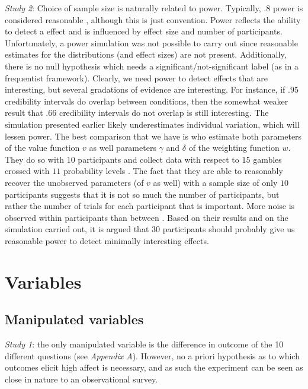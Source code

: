 \documentclass[12pt]{article}
\begin{document}
\emph{Study 2}: Choice of sample
size is naturally related to
power. Typically, $.8$ power is considered reasonable
\autocite{cohen1992power},
although this is just convention. Power reflects the
ability to detect a effect and is influenced by
effect size and number of participants.
Unfortunately, a power simulation was not possible
to carry out since reasonable estimates for the
distributions (and effect sizes) are not present.
Additionally, there is no null hypothesis which
needs a significant/not-significant label (as
in a frequentist framework). Clearly, we need
power to detect effects that are interesting,
but several gradations of evidence are interesting.
For instance, if $.95$ credibility intervals do overlap
between conditions,
then the somewhat weaker result that  $.66$
credibility intervals do not overlap is still
interesting.
The simulation presented earlier likely underestimates
individual variation, which will lessen power.
The best comparison that we have is
\textcite{gonzalez1999shape} who estimate both
parameters of the value function $v$ as well
parameters $\gamma$ and  $\delta$ of the weighting
function  $w$. They do so with  $10$ participants and
collect data with respect to $15$ gambles crossed
with  $11$ probability levels \autocite{gonzalez1999shape}.
The fact that they are able to reasonably recover
the unobserved parameters (of  $v$ as well) with
a sample size of only $10$ participants suggests
that it is not so much the number of participants,
but rather the number of trials for each participant
that is important. More noise is observed within
participants than between \autocite{gonzalez1999shape}.
Based on their results and on the simulation carried
out, it is argued that $30$ participants should
probably give us reasonable power to detect
minimally interesting effects.

\section{Variables}

\subsection{Manipulated variables}

\emph{Study 1}: the only manipulated
variable is the difference in outcome
of the 10 different questions (see \emph{Appendix A}).
However, no a priori hypothesis as to which
outcomes elicit high affect is necessary,
and as such the experiment can be seen as
close in nature to an observational survey. \\
\end{document}
